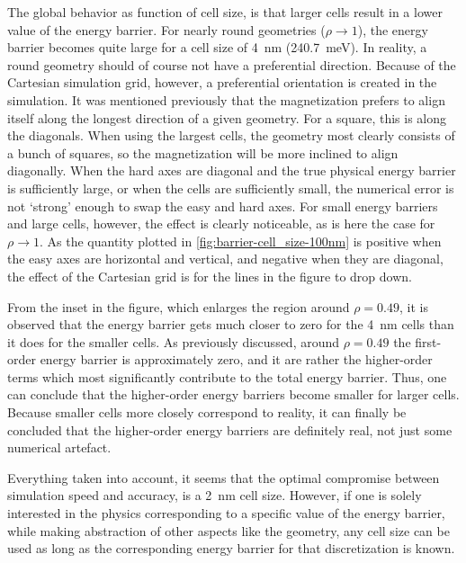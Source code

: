 \documentclass[11pt,a4paper,english,twoside]{article}
\begin{document}
The global behavior as function of cell size, is that larger cells result in a lower value of the energy barrier. For nearly round geometries ($\rho \rightarrow 1$), the energy barrier becomes quite large for a cell size of \SI{4}{\nano\metre} (\SI{240.7}{\milli\electronvolt}). In reality, a round geometry should of course not have a preferential direction. Because of the Cartesian simulation grid, however, a preferential orientation is created in the simulation. It was mentioned previously that the magnetization prefers to align itself along the longest direction of a given geometry. For a square, this is along the diagonals. When using the largest cells, the geometry most clearly consists of a bunch of squares, so the magnetization will be more inclined to align diagonally. When the hard axes are diagonal and the true physical energy barrier is sufficiently large, or when the cells are sufficiently small, the numerical error is not `strong' enough to swap the easy and hard axes. For small energy barriers and large cells, however, the effect is clearly noticeable, as is here the case for $\rho \rightarrow 1$. As the quantity plotted in \cref{fig:barrier-cell_size-100nm} is positive when the easy axes are horizontal and vertical, and negative when they are diagonal, the effect of the Cartesian grid is for the lines in the figure to drop down. \par
From the inset in the figure, which enlarges the region around $\rho=0.49$, it is observed that the energy barrier gets much closer to zero for the \SI{4}{\nano\metre} cells than it does for the smaller cells. As previously discussed, around $\rho=0.49$ the first-order energy barrier is approximately zero, and it are rather the higher-order terms which most significantly contribute to the total energy barrier. Thus, one can conclude that the higher-order energy barriers become smaller for larger cells. Because smaller cells more closely correspond to reality, it can finally be concluded that the higher-order energy barriers are definitely real, not just some numerical artefact. \par
Everything taken into account, it seems that the optimal compromise between simulation speed and accuracy, is a \SI{2}{\nano\metre} cell size. However, if one is solely interested in the physics corresponding to a specific value of the energy barrier, while making abstraction of other aspects like the geometry, any cell size can be used as long as the corresponding energy barrier for that discretization is known.
\end{document}
